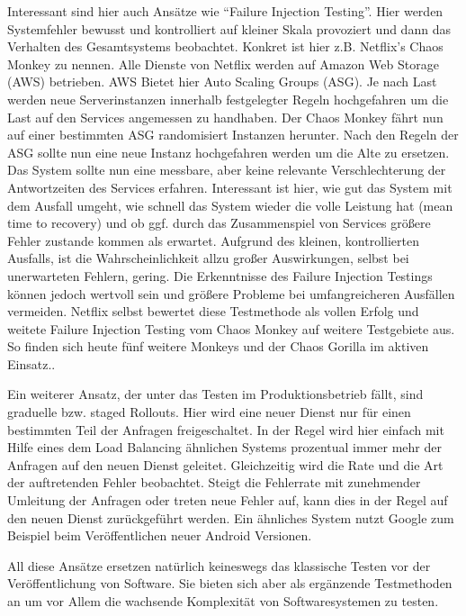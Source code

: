 Interessant sind hier auch Ansätze wie ``Failure Injection Testing''.\cite[][]{netflix:fit} Hier werden Systemfehler bewusst und kontrolliert auf kleiner Skala provoziert und dann das Verhalten des Gesamtsystems beobachtet. Konkret ist hier z.B. Netflix's Chaos Monkey\cite[][]{netflix:chaosmonkey} zu nennen. Alle Dienste von Netflix werden auf Amazon Web Storage (AWS)\cite{aws} betrieben. AWS Bietet hier Auto Scaling Groups (ASG). Je nach Last werden neue Serverinstanzen innerhalb festgelegter Regeln hochgefahren um die Last auf den Services angemessen zu handhaben. Der Chaos Monkey fährt nun auf einer bestimmten ASG randomisiert Instanzen herunter. Nach den Regeln der ASG sollte nun eine neue Instanz hochgefahren werden um die Alte zu ersetzen. Das System sollte nun eine messbare, aber keine relevante Verschlechterung der Antwortzeiten des Services erfahren. Interessant ist hier, wie gut das System mit dem Ausfall umgeht, wie schnell das System wieder die volle Leistung hat (mean time to recovery) und ob ggf. durch das Zusammenspiel von Services größere Fehler zustande kommen als erwartet. Aufgrund des kleinen, kontrollierten Ausfalls, ist die Wahrscheinlichkeit allzu großer Auswirkungen, selbst bei unerwarteten Fehlern, gering. Die Erkenntnisse des Failure Injection Testings können jedoch wertvoll sein und größere Probleme bei umfangreicheren Ausfällen vermeiden. Netflix selbst bewertet diese Testmethode als vollen Erfolg und weitete Failure Injection Testing vom Chaos Monkey auf weitere Testgebiete aus. So finden sich heute fünf weitere Monkeys und der Chaos Gorilla im aktiven Einsatz.\cite[][]{netflix:army}.

Ein weiterer Ansatz, der unter das Testen im Produktionsbetrieb fällt, sind graduelle bzw. staged Rollouts. Hier wird eine neuer Dienst nur für einen bestimmten Teil der Anfragen freigeschaltet. In der Regel wird hier einfach mit Hilfe eines dem Load Balancing ähnlichen Systems prozentual immer mehr der Anfragen auf den neuen Dienst geleitet. Gleichzeitig wird die Rate und die Art der auftretenden Fehler beobachtet. Steigt die Fehlerrate mit zunehmender Umleitung der Anfragen oder treten neue Fehler auf, kann dies in der Regel auf den neuen Dienst zurückgeführt werden. Ein ähnliches System nutzt Google zum Beispiel beim Veröffentlichen neuer Android Versionen.\cite[vgl.][]{Google:staged}

All diese Ansätze ersetzen natürlich keineswegs das klassische Testen vor der Veröffentlichung von Software. Sie bieten sich aber als ergänzende Testmethoden an um vor Allem die wachsende Komplexität von Softwaresystemen zu testen.


